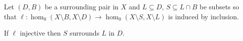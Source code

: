 \begin{lemma}\label{lem:cov_surrounds}
  Let $(D, B)$ be a surrounding pair in $X$ and $L\subseteq D$, $S\subseteq L\cap B$ be subsets so that $\ell: \hom_0(X\setminus B, X\setminus D)\to \hom_0(X\setminus S, X\setminus L)$ is induced by inclusion.

  If $\ell$ injective then $S$ surrounds $L$ in $D$.
\end{lemma}
%
